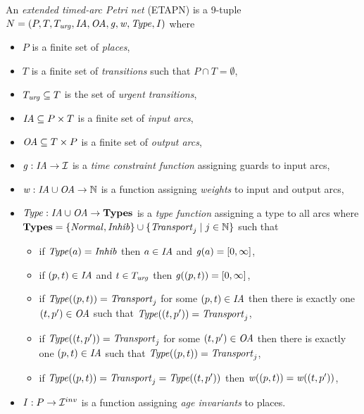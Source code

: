 \begin{definition} \label{defetapn}  
An \emph{extended timed-arc Petri net} 
(ETAPN) is a 9-tuple $N = (P, T, T_{\mathit{urg}}, \mathit{IA},\allowbreak \mathit{OA}, \mathit{g}, \mathit{w}, \mathit{Type}, \mathit{I})$ where 
\begin{itemize}
\item $P$ is a finite set of \emph{places},
\item $T$ is a finite set of \emph{transitions} 
such that $P \cap T = \emptyset$, 
\item $T_{\mathit{urg}} \subseteq T$ is the set of \emph{urgent transitions},
\item $\mathit{IA} \subseteq P \times T$ is a finite set of \emph{input arcs},
\item $\mathit{OA} \subseteq T \times P$ is a finite set of \emph{output arcs},
\item $\mathit{g} : \mathit{IA} \rightarrow \mathcal{I}$ is a \emph{time constraint function} assigning 
guards %
to input arcs,
\item $\mathit{w} : \mathit{IA}\cup \mathit{OA} \rightarrow \mathbb{N}$ is a function assigning \emph{weights} to input and output arcs,
\item $\mathit{Type} : \mathit{IA} \cup \mathit{OA} \rightarrow \mathbf{{Types}}$ is a \emph{type function} assigning a type to all arcs where $\mathbf{{Types}} = \{\mathit{Normal}, \mathit{Inhib}\} \cup \{\mathit{Transport}_j \mid j \in \mathbb{N} \}$ such that  
\begin{itemize}
\item if $\mathit{Type}(a) = \mathit{Inhib}$ then $a \in \mathit{IA}$ and $\mathit{g}(a)=[0,\infty]$, 
\item if $(p,t) \in \mathit{IA}$ and $t \in T_{\mathit{urg}}$ then $\mathit{g}((p,t))=[0,\infty]$,
\item if $\mathit{Type}((p,t)) = \mathit{Transport}_j$ for some $(p,t) \in \mathit{IA}$ then there is exactly one $(t,p^{\prime}) \in \mathit{OA}$ such that $\mathit{Type}((t,p^{\prime})) = 
\mathit{Transport}_j$, 
\item if $\mathit{Type}((t,p^{\prime})) = \mathit{Transport}_j$ for some $(t,p^{\prime}) \in \mathit{OA}$ then there is exactly one $(p,t) \in \mathit{IA}$ such that $\mathit{Type}((p,t)) = 
\mathit{Transport}_j$, 
\item if $\mathit{Type}((p,t)) = \mathit{Transport}_j = \mathit{Type}((t,p^{\prime}))$ 
then $\mathit{w}((p,t))=\mathit{w}((t,p^{\prime}))$,
\end{itemize}
\item $\mathit{I} : P \rightarrow \mathcal{I}^{inv}$ is a function assigning \emph{age invariants} to places.
\end{itemize}
\end{definition}

